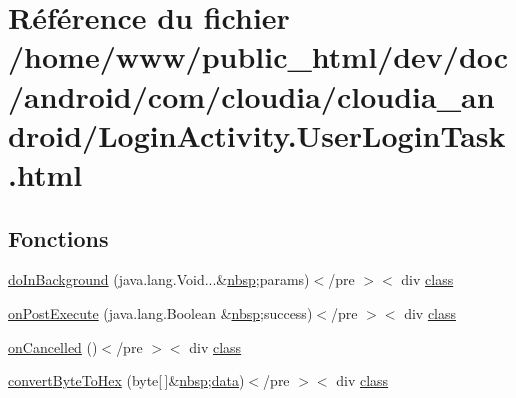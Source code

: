 \hypertarget{_login_activity_8_user_login_task_8html}{\section{Référence du fichier /home/www/public\-\_\-html/dev/doc/android/com/cloudia/cloudia\-\_\-android/\-Login\-Activity.User\-Login\-Task.\-html}
\label{_login_activity_8_user_login_task_8html}
}
\subsection*{Fonctions}
\begin{DoxyCompactItemize}
\item 
\hyperlink{_login_activity_8_user_login_task_8html_a71833cc0ab85a5d1594ec7370ead85b4}{do\-In\-Background} (java.\-lang.\-Void...\&\hyperlink{_tools_8html_aef915316f784c9063d942974538301a6}{nbsp};params)$<$/pre $>$$<$ div \hyperlink{_tools_8html_acf06f836132665ba8114f5a414c2403f}{class}
\item 
\hyperlink{_login_activity_8_user_login_task_8html_a3f48f5eeb52fc90d9f58e9921382c831}{on\-Post\-Execute} (java.\-lang.\-Boolean \&\hyperlink{_tools_8html_aef915316f784c9063d942974538301a6}{nbsp};success)$<$/pre $>$$<$ div \hyperlink{_tools_8html_acf06f836132665ba8114f5a414c2403f}{class}
\item 
\hyperlink{_login_activity_8_user_login_task_8html_a282a04e5a8efdd819097f06d0a4e387b}{on\-Cancelled} ()$<$/pre $>$$<$ div \hyperlink{_tools_8html_acf06f836132665ba8114f5a414c2403f}{class}
\item 
\hyperlink{_login_activity_8_user_login_task_8html_a314619285725fff970407ec4c2ad3030}{convert\-Byte\-To\-Hex} (byte\mbox{[}$\,$\mbox{]}\&\hyperlink{_tools_8html_aef915316f784c9063d942974538301a6}{nbsp};\hyperlink{_show_all_list_adapter_8html_a511ae0b1c13f95e5f08f1a0dd3da3d93}{data})$<$/pre $>$$<$ div \hyperlink{_tools_8html_acf06f836132665ba8114f5a414c2403f}{class}
\item 

\end{DoxyCompactItemize}
